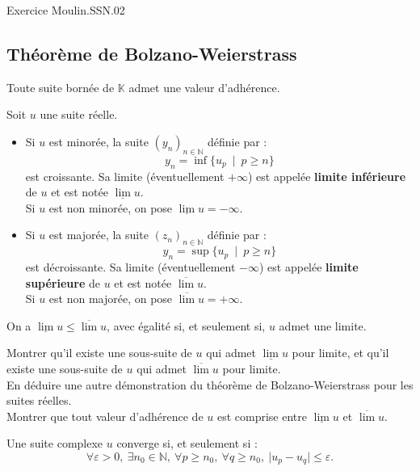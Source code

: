 \documentclass[french]{article}
\newcommand{\N}{\mathbb{N}}
\newcommand{\K}{\mathbb{K}}
\theoremstyle{plain}
\theoremstyle{definition}
\theoremstyle{remark}
\begin{document}
Exercice Moulin.SSN.02

\subsection{Théorème de Bolzano-Weierstrass}

\begin{thm}%
	Toute suite bornée de $\K$ admet une valeur d'adhérence.
\end{thm}

\begin{dfn}
	Soit $u$ une suite réelle.
	\begin{itemize}
		\item Si $u$ est minorée, la suite $(y_n)_{n\in\N}$ définie par : $$y_n=\inf\{u_p\ \mid\ p\geqslant n\}$$ est croissante. Sa limite (éventuellement $+\infty$) est appelée \textbf{limite inférieure} de $u$ et est notée $\underline{\lim}u$. \\
		Si $u$ est non minorée, on pose $\underline{\lim}u=-\infty$.
		\item Si $u$ est majorée, la suite $(z_n)_{n\in\N}$ définie par : $$y_n=\sup\{u_p\ \mid\ p\geqslant n\}$$ est décroissante. Sa limite (éventuellement $-\infty$) est appelée \textbf{limite supérieure} de $u$ et est notée $\overline{\lim}u$.\\
		Si $u$ est non majorée, on pose $\overline{\lim}u=+\infty$.
	\end{itemize}
\end{dfn}

\begin{prop}[HP]%
	On a $\underline{\lim}u\leqslant\overline{\lim}u$, avec égalité si, et seulement si, $u$ admet une limite.
\end{prop}

\begin{exo}
	Montrer qu'il existe une sous-suite de $u$ qui admet $\underline{\lim}u$ pour limite, et qu'il existe une sous-suite de $u$ qui admet $\overline{\lim}u$ pour limite. \\
	En déduire une autre démonstration du théorème de Bolzano-Weierstrass pour les suites réelles. \\
	Montrer que tout valeur d'adhérence de $u$ est comprise entre $\underline{\lim}u$ et $\overline{\lim}u$.
\end{exo}

\begin{thm}
	Une suite complexe $u$ converge si, et seulement si : $$\forall\varepsilon>0,\ \exists n_0\in\N,\ \forall p\geqslant n_0,\ \forall q\geqslant n_0,\ \lvert u_p-u_q\rvert\leqslant\varepsilon.$$
\end{thm}
\end{document}
